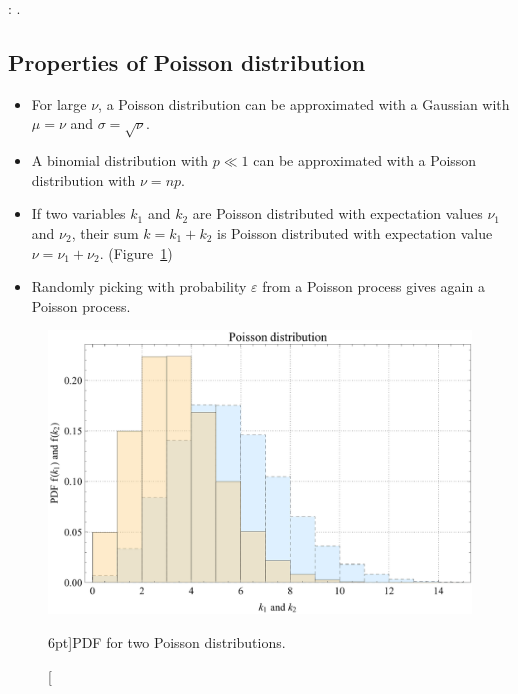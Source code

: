 : .

\subsection{Properties of Poisson distribution}
\label{subsec:prop_of_poisson_distr}

\begin{itemize}
	\item For large $\nu$, a Poisson distribution can be approximated with a Gaussian with $\mu = \nu$ and $\sigma = \sqrt{\nu}$.
	\item A binomial distribution with $p \ll 1$ can be approximated with a Poisson distribution with $\nu = np$.
	\item If two variables $k_{1}$ and $k_{2}$ are Poisson distributed with expectation values $\nu_{1}$ and $\nu_{2}$, their sum $k = k_{1} + k_{2}$ is Poisson distributed with expectation value $\nu = \nu_{1} + \nu_{2}$. (Figure~\ref{fig:prop_of_Poisson_distr}) 
	\item Randomly picking with probability $\varepsilon$ from a Poisson process gives again a Poisson process.
\end{itemize}

\begin{figure}
	\includegraphics{probability/prop_of_Poisson_distr.pdf}
	\caption[PDF for two Poisson distributions.][6pt]{PDF for two Poisson distributions.}
	\label{fig:prop_of_Poisson_distr}
\end{figure}

